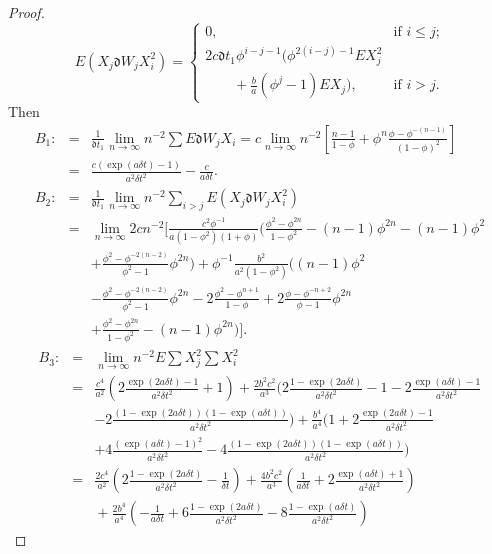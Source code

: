\documentclass[12pt,reqno, a4paper]{article}
\numberwithin{equation}{section}
\begin{document}
\begin{proof}
\[
E ( X_{j}\mathfrak{d} W_j X_i^2)=
\begin{cases}
0, &\text{if $i\leq j$;}\\
2c\mathfrak{d} t_1\phi^{i-j-1}(\phi^{2(i-j)-1}EX_j^2\\\quad\quad+\frac b a (\phi^j-1)EX_j), &\text{if $i>j$.}
\end{cases}
\]
 Then
     \begin{eqnarray*}
B_1:&=&\frac 1 {\mathfrak{d} t_1}\lim_{n\to \infty} n^{-2}\sum E\mathfrak{d} W_j X_i=c\lim_{n\to \infty}n^{-2}[\frac {n-1}{1-\phi}+\phi^{n}\frac {\phi-\phi^{-(n-1)}}{(1-\phi)^2}]\\
&=& \frac { c(\exp(a\delta t)-1)} {a^2\delta t^2}-\frac c {a\delta t}. \\
B_2:&=&\frac 1 {\mathfrak{d} t_1}\lim_{n\to \infty} n^{-2}\sum_{i>j}E( X_{j}\mathfrak{d} W_j X_i^2)\\&=&\lim_{n\to \infty}
2cn^{-2}[\frac {c^2\phi^{-1}}{a(1-\phi^2)(1+\phi)}(\frac{\phi^2-\phi^{2n}}{1-\phi^2}-(n-1)\phi^{2n}-(n-1)\phi^2\\&&+\frac {\phi^2-\phi^{-2(n-2)}}{\phi^2-1}\phi^{2n})+\phi^{-1}\frac {b^2}{a^2(1-\phi^2)}
((n-1)\phi^2\\&&-\frac {\phi^2-\phi^{-2(n-2)}}{\phi^2-1}\phi^{2n}-2\frac {\phi^2-\phi^{n+1}}{1-\phi}+2\frac {\phi-\phi^{-n+2}}{\phi-1}\phi^{2n}\\&&+\frac {\phi^2-\phi^{2n}}{1-\phi^2}-(n-1)\phi^{2n}) ].
 \end{eqnarray*}
 \begin{eqnarray*}
B_3:&=&\lim_{n\to \infty} n^{-2}E\sum X_j^2 \sum X_i^2\\&=&\frac {c^4}{a^2}(2\frac {\exp(2a\delta t)-1}{a^2\delta t^2}+1)+\frac {2b^2c^2} {a^3}(2\frac {1-\exp(2a\delta t)}{a^2\delta t^2}-1-2\frac {\exp(a\delta t)-1}{a^2\delta t^2}\\&&-2\frac {(1-\exp(2a\delta t))(1-\exp(a\delta t))}{a^2\delta t^2})+\frac {b^4} {a^4}(1+2\frac {\exp(2a\delta t)-1}{a^2\delta t^2}\\&&+4\frac {(\exp(a\delta t)-1)^2}{a^2\delta t^2}-4\frac {(1-\exp(2a\delta t))(1-\exp(a\delta t))}{a^2\delta t^2}) \\&=&\frac {2c^4}{a^2}(2\frac {1-\exp(2a\delta t)}{a^2\delta t^2}-\frac 1 {\delta t})+\frac {4b^2c^2} {a^3}(\frac {1}{a\delta t}+2\frac {\exp(a\delta t)+1}{a^2\delta t^2})\\&&{}+\frac {2b^4} {a^4}(-\frac {1}{a\delta t}+6\frac {1-\exp(2a\delta t)}{a^2\delta t^2}-8\frac {1-\exp(a\delta t)}{a^2\delta t^2}) \end{eqnarray*}

\end{proof}
\end{document}

